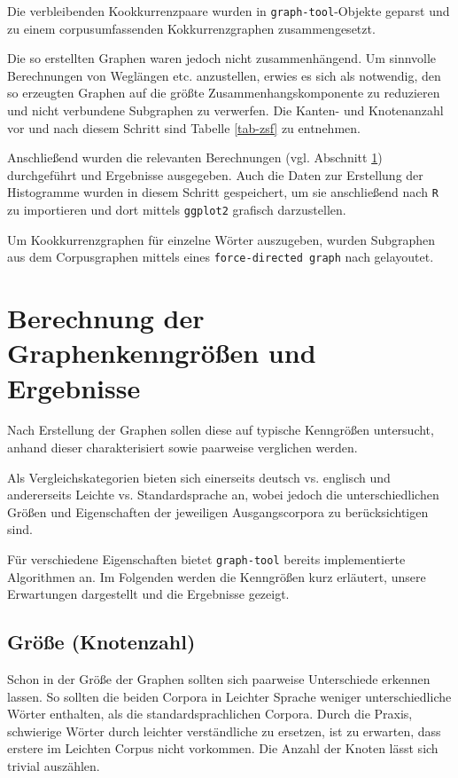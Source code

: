 \documentclass[11pt, a4paper]{article}
\begin{document}
Die verbleibenden Kookkurrenzpaare wurden in \texttt{graph-tool}-Objekte geparst
und zu einem corpusumfassenden Kokkurrenzgraphen zusammengesetzt.

Die so erstellten Graphen waren jedoch nicht zusammenhängend.
Um sinnvolle Berechnungen von Weglängen etc. anzustellen, erwies es sich als
notwendig, den so erzeugten Graphen auf die größte Zusammenhangskomponente zu
reduzieren und nicht verbundene Subgraphen zu verwerfen.
Die Kanten- und Knotenanzahl vor und nach diesem Schritt sind Tabelle
\ref{tab-zsf} zu entnehmen.

Anschließend wurden die relevanten Berechnungen (vgl. Abschnitt
\ref{sec:berechnung-ergebnisse}) durchgeführt und Ergebnisse ausgegeben.
Auch die Daten zur Erstellung der Histogramme wurden in diesem Schritt
gespeichert, um sie anschließend nach \texttt{R} zu importieren und dort mittels
\texttt{ggplot2} grafisch darzustellen.

Um Kookkurrenzgraphen für einzelne Wörter auszugeben, wurden Subgraphen aus dem
Corpusgraphen mittels eines \texttt{force-directed graph} nach
\cite{Hu2006} gelayoutet.


\section{Berechnung der Graphenkenngr\"o\ss{}en und Ergebnisse}
\label{sec:berechnung-ergebnisse}

Nach Erstellung der Graphen sollen diese auf typische Kenngrößen untersucht,
anhand dieser charakterisiert sowie paarweise verglichen werden.

Als Vergleichskategorien bieten sich einerseits deutsch vs. englisch und andererseits Leichte vs.
Standardsprache an, wobei jedoch die unterschiedlichen Größen und Eigenschaften der
jeweiligen Ausgangscorpora zu berücksichtigen sind.

Für verschiedene Eigenschaften bietet \texttt{graph-tool} bereits implementierte
Algorithmen an. Im Folgenden werden die Kenngrößen kurz erläutert, unsere
Erwartungen dargestellt und die Ergebnisse gezeigt.


\subsection{Gr\"o\ss{}e (Knotenzahl)}
\label{groesse-knotenzahl}

Schon in der Größe der Graphen sollten sich paarweise Unterschiede erkennen
lassen. So sollten die beiden Corpora in Leichter Sprache weniger
unterschiedliche Wörter enthalten, als die standardsprachlichen Corpora.
Durch die Praxis, schwierige Wörter
durch leichter verständliche zu ersetzen, ist zu erwarten, dass erstere im
Leichten Corpus nicht vorkommen. Die Anzahl der Knoten lässt sich trivial
auszählen.
\end{document}
